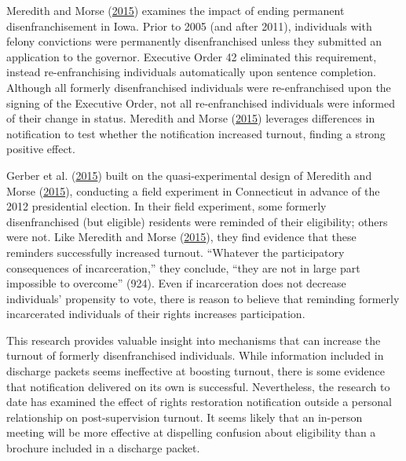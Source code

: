 \documentclass[
  12pt,
]{article}
\begin{document}
Meredith and Morse (\protect\hyperlink{ref-Meredith2015}{2015}) examines the impact of ending permanent disenfranchisement in Iowa. Prior to 2005 (and after 2011), individuals with felony convictions were permanently disenfranchised unless they submitted an application to the governor. Executive Order 42 eliminated this requirement, instead re-enfranchising individuals automatically upon sentence completion. Although all formerly disenfranchised individuals were re-enfranchised upon the signing of the Executive Order, not all re-enfranchised individuals were informed of their change in status. Meredith and Morse (\protect\hyperlink{ref-Meredith2015}{2015}) leverages differences in notification to test whether the notification increased turnout, finding a strong positive effect.

Gerber et al. (\protect\hyperlink{ref-Gerber2015}{2015}) built on the quasi-experimental design of Meredith and Morse (\protect\hyperlink{ref-Meredith2015}{2015}), conducting a field experiment in Connecticut in advance of the 2012 presidential election. In their field experiment, some formerly disenfranchised (but eligible) residents were reminded of their eligibility; others were not. Like Meredith and Morse (\protect\hyperlink{ref-Meredith2015}{2015}), they find evidence that these reminders successfully increased turnout. ``Whatever the participatory consequences of incarceration,'' they conclude, ``they are not in large part impossible to overcome'' (924). Even if incarceration does not decrease individuals' propensity to vote, there is reason to believe that reminding formerly incarcerated individuals of their rights increases participation.

This research provides valuable insight into mechanisms that can increase the turnout of formerly disenfranchised individuals. While information included in discharge packets seems ineffective at boosting turnout, there is some evidence that notification delivered on its own is successful. Nevertheless, the research to date has examined the effect of rights restoration notification outside a personal relationship on post-supervision turnout. It seems likely that an in-person meeting will be more effective at dispelling confusion about eligibility than a brochure included in a discharge packet.
\end{document}
